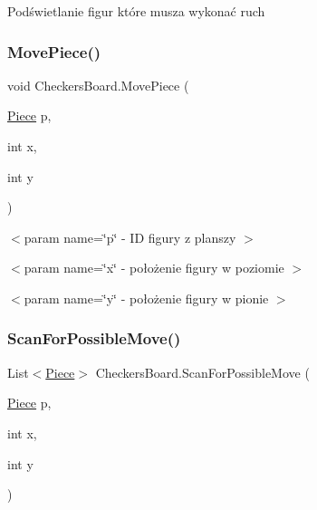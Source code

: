 Podświetlanie figur które musza wykonać ruch 

\mbox{\label{class_checkers_board_abdc45f3ba65e875a4e7a6d751014c1ee}} 
\subsubsection{\texorpdfstring{MovePiece()}{MovePiece()}}
{\footnotesize\ttfamily void Checkers\+Board.\+Move\+Piece (\begin{DoxyParamCaption}\item[{\mbox{\hyperlink{class_piece}{Piece}}}]{p,  }\item[{int}]{x,  }\item[{int}]{y }\end{DoxyParamCaption})\hspace{0.3cm}{\ttfamily [private]}}





$<$param name=\char`\"{}p\char`\"{} -\/ ID figury z planszy $>$

$<$param name=\char`\"{}x\char`\"{} -\/ położenie figury w poziomie $>$

$<$param name=\char`\"{}y\char`\"{} -\/ położenie figury w pionie $>$\mbox{\label{class_checkers_board_ad2c9c13a174af762f34a411fc290d02a}} 
\subsubsection{\texorpdfstring{ScanForPossibleMove()}{ScanForPossibleMove()}\hspace{0.1cm}{\footnotesize\ttfamily [1/2]}}
{\footnotesize\ttfamily List$<$\mbox{\hyperlink{class_piece}{Piece}}$>$ Checkers\+Board.\+Scan\+For\+Possible\+Move (\begin{DoxyParamCaption}\item[{\mbox{\hyperlink{class_piece}{Piece}}}]{p,  }\item[{int}]{x,  }\item[{int}]{y }\end{DoxyParamCaption})\hspace{0.3cm}{\ttfamily [private]}}



